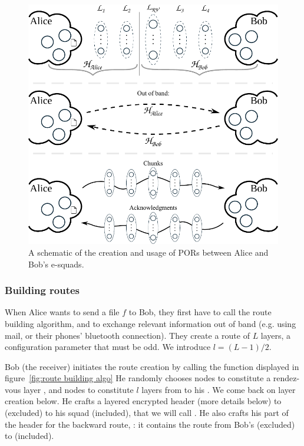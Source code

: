 \begin{figure}[t]
  \includegraphics[width=\linewidth]{figures/file_exchange_v2.pdf}
  \caption{\label{fig:file-exchange}A schematic of the creation and usage of PORs between Alice and Bob's e-squads.}
\end{figure}

\subsubsection{Building routes} 
\label{ssub:building_routes}


When Alice wants to send a file $f$ to Bob, they first have to call the route building algorithm, and to exchange relevant information out of band (e.g. using mail, or their phones' bluetooth connection).
They create a route of $L$ layers, a configuration parameter that must be odd. We introduce $l=(L-1)/2$.

Bob (the receiver) initiates the route creation by calling the \Recv function displayed in figure~\ref{fig:route building algo}
He randomly chooses nodes to constitute a rendez-vous layer \LRV, and nodes to constitute $l$ layers from \LRV to his \squad. 
We come back on layer creation below.
He crafts a layered encrypted header (more details below) to \LRV (excluded) to his squad (included), that we will call \Hrecforward.
He also crafts his part of the header for the backward route, \Hrecbackward: it contains the route from Bob's \squad (excluded) to \LRV (included).

